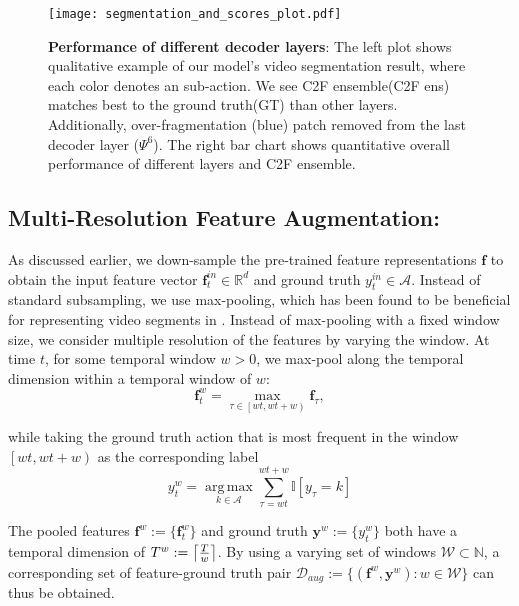 \documentclass[10pt,twocolumn,letterpaper]{article}
\DeclareMathOperator{\argmax}{\arg\,\max}
\newcommand{\calD}{\mathcal{D}}
\newcommand{\calA}{\mathcal{A}}
\newcommand{\calW}{\mathcal{W}}
\newcommand{\bbR}{\mathbb{R}}
\newcommand{\bbI}{\mathbb{I}}
\newcommand{\by}{\mathbf{y}}
\newcommand{\feat}{\mathbf{f}}
\newcommand{\sqBK}[1]{ {\left[ #1 \right]} }
\DeclarePairedDelimiter\ceil{\lceil}{\rceil}
\begin{document}
\begin{figure*}
\begin{center}
\texttt{[image: segmentation\_and\_scores\_plot.pdf]}
\end{center}
\caption{\textbf{Performance of different decoder layers}: The left plot shows qualitative example of our model's video segmentation result, where each color denotes an sub-action. We see C2F ensemble(C2F ens) matches best to the ground truth(GT) than other layers. Additionally, over-fragmentation (blue) patch removed from the last decoder layer ($\Psi^6$). The right bar chart shows quantitative overall performance of different layers and C2F ensemble.}
\label{fig:layer-analysis}
\end{figure*}

\subsection{Multi-Resolution Feature Augmentation:}\label{subsec:augmentation}
As discussed earlier, we down-sample the pre-trained feature representations $\feat$ to obtain the input feature vector $\feat^{in}_t \in \bbR^{d}$ and ground truth $y^{in}_t \in \calA$. Instead of standard subsampling, we use max-pooling, which has been found to be beneficial for representing video segments in \cite{sener2020temporal}. Instead of max-pooling with a fixed window size, we consider multiple resolution of the features by varying the window. At time $t$, for some temporal window $w > 0$, we max-pool along the temporal dimension within a temporal window of $w$: 
\begin{equation}\label{eqn:downsample}
    \feat^{w}_t = \max_{\tau \in \left[wt, wt+w\right)} \feat_{\tau},
\end{equation}

\noindent while taking the ground truth action that is most frequent in the window $\left[wt, wt+w\right)$ as the corresponding label
\begin{equation}
    y^{w}_t = \underset{k \in \calA}{\argmax} \sum_{\tau=wt}^{wt+w} \bbI\sqBK{y_{\tau}=k}
\end{equation}

\noindent The pooled features $\feat^{w} := \{\feat^{w}_t\}$ and ground truth $\by^{w} := \{y^w_t\}$ both have a temporal dimension of $T^w := \ceil*{\frac{T}{w}}$. By using a varying set of windows $\calW \subset \mathbb{N}$, a corresponding set of feature-ground truth pair $\calD_{aug} := \{(\feat^w, \by^w): w \in \calW\}$ can thus be obtained. 
\end{document}
